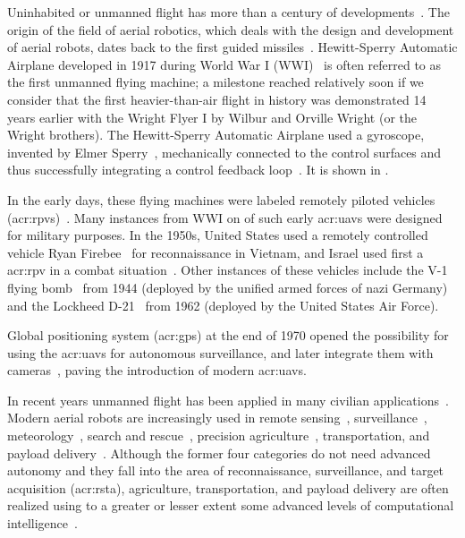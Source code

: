 Uninhabited or unmanned flight has more than a century of developments~\citep{siciliano2016springer}. The origin of the field of aerial robotics, which deals with the design and development of aerial robots, dates back to the first guided missiles~\citep{siciliano2016springer}. Hewitt-Sperry Automatic Airplane developed in 1917 during World War I (WWI)~\citep{keane2013brief,valavanis2015handbook} is often referred to as the first unmanned flying machine; a milestone reached relatively soon if we consider that the first heavier-than-air flight in history was demonstrated 14 years earlier with the Wright Flyer I by Wilbur and Orville Wright (or the Wright brothers). The Hewitt-Sperry Automatic Airplane used a gyroscope, invented by Elmer Sperry~\citep{keane2013brief}, mechanically connected to the control surfaces and thus successfully integrating a control feedback loop~\citep{siciliano2016springer}. It is shown in .

In the early days, these flying machines were labeled remotely piloted vehicles (\Gls{acr:rpv}s)~\citep{anderson2005introduction}. Many instances from WWI on of such early \Gls{acr:uav}s were designed for military purposes. In the 1950s, United States used a remotely controlled vehicle Ryan Firebee~ for reconnaissance in Vietnam, and Israel used first a \Gls{acr:rpv} in a combat situation~\citep{anderson2005introduction}. Other instances of these vehicles include the V-1 flying bomb~ from 1944 (deployed by the unified armed forces of nazi Germany) and the Lockheed D-21~ from 1962 (deployed by the United States Air Force).

Global positioning system (\Gls{acr:gps}) at the end of 1970 opened the possibility for using the \Gls{acr:uav}s for autonomous surveillance, and later integrate them with cameras~\citep{siciliano2016springer}, paving the introduction of modern \Gls{acr:uav}s.

In recent years unmanned flight has been applied in many civilian applications~\citep{gonzalez2017unmanned}. Modern aerial robots are increasingly used in remote sensing~\citep{noor2018remote,tang2015drone,milas2018drones}, surveillance~\citep{paucar2018use,burkle2009collaborating}, meteorology~\citep{schuyler2019using}, search and rescue~\citep{pensieri2020drones,karaca2018potential,cui2015drones,seguin2018unmanned}, precision agriculture~\citep{daponte2019review,puri2017agriculture}, transportation, and payload delivery~\citep{kellermann2020drones}. Although the former four categories do not need advanced autonomy and they fall into the area of reconnaissance, surveillance, and target acquisition (\Gls{acr:rsta}), agriculture, transportation, and payload delivery are often realized using to a greater or lesser extent some advanced levels of computational intelligence~\citep{siciliano2016springer}. 

